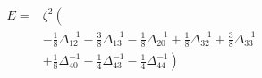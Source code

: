 \documentclass[11pt]{article}
\begin{document}
\begin{equation*}\begin{split}E=&\zeta^2\left(\right.\\
&-\frac{1}{8}\Delta_{12}^{-1}-\frac{3}{8}\Delta_{13}^{-1}-\frac{1}{8}\Delta_{20}^{-1}+\frac{1}{8}\Delta_{32}^{-1}+\frac{3}{8}\Delta_{33}^{-1}\\
&+\frac{1}{8}\Delta_{40}^{-1}-\frac{1}{4}\Delta_{43}^{-1}-\frac{1}{4}\Delta_{44}^{-1}\left.\right)\end{split}\end{equation*}\newline
\end{document}
